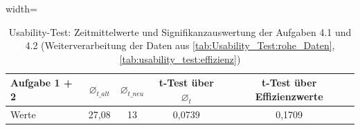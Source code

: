 \begin{table}[h]
    \centering
    \begin{adjustbox}{width=\textwidth}
    \begin{tabular}{|l|c|c|c||c|}
    \hline
        Aufgabe 1 + 2 & $\varnothing_{t\_alt}$ & $\varnothing_{t\_neu}$ & t-Test über $\varnothing_t$ & t-Test über Effizienzwerte \\ \hline
        Werte & 27,08 & 13 & 0,0739 & 0,1709 \\ \hline
    \end{tabular}
    \end{adjustbox}
    \caption{Usability-Test: Zeitmittelwerte und Signifikanzauswertung der Aufgaben 4.1 und 4.2 (Weiterverarbeitung der Daten aus \autoref{tab:Usability_Test:rohe_Daten}, \autoref{tab:usability_test:effizienz})}
    \label{tab:Usability-Test:ttest_4.1+4.2}
\end{table}
